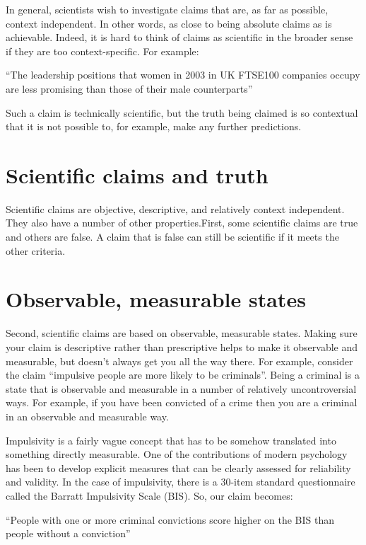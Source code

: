 \documentclass[12pt]{article}
\begin{document}
In general, scientists wish to investigate claims that are, as far as
possible, context independent. In other words, as close to being
absolute claims as is achievable. Indeed, it is hard to think of
claims as scientific in the broader sense if they are too
context-specific.  For example:

``The leadership positions that women in 2003 in UK FTSE100 companies
occupy are less promising than those of their male counterparts''

Such a claim is technically scientific, but the truth being claimed is
so contextual that it is not possible to, for example, make any
further predictions.

\section{Scientific claims and truth}

Scientific claims are objective, descriptive, and relatively context
independent. They also have a number of other properties.First, some
scientific claims are true and others are false. A claim that is false
can still be scientific if it meets the other criteria.

\section{Observable, measurable states}

Second, scientific claims are based on observable, measurable
states. Making sure your claim is descriptive rather than prescriptive
helps to make it observable and measurable, but doesn't always get you
all the way there. For example, consider the claim ``impulsive people
are more likely to be criminals''. Being a criminal is a state that is
observable and measurable in a number of relatively uncontroversial
ways. For example, if you have been convicted of a crime then you are
a criminal in an observable and measurable way.

Impulsivity is a fairly vague concept that has to be somehow
translated into something directly measurable. One of the
contributions of modern psychology has been to develop explicit
measures that can be clearly assessed for reliability and validity. In
the case of impulsivity, there is a 30-item standard questionnaire
called the Barratt Impulsivity Scale (BIS). So, our claim becomes:

``People with one or more criminal convictions score higher on the BIS
than people without a conviction''
\end{document}
